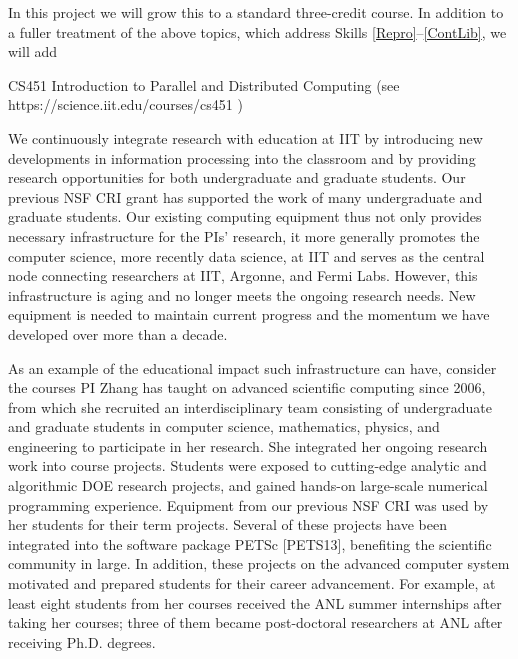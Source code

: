 \documentclass[11pt]{NSFamsart}
\begin{document}
In this project we will grow this to a standard three-credit course.  In addition to a fuller treatment of the above topics, which address Skills \ref{Repro}--\ref{ContLib}, we will add 

CS451 Introduction to Parallel and Distributed Computing (see https://science.iit.edu/courses/cs451 )

We continuously integrate research with education at IIT by introducing new developments in information processing into the classroom and by providing research opportunities for both undergraduate and graduate students. Our previous NSF CRI grant has supported the work of many undergraduate and graduate students. Our existing computing equipment thus not only provides necessary infrastructure for the PIs' research, it more generally promotes the computer science, more recently data science, at IIT and serves as the central node connecting researchers at IIT, Argonne, and Fermi Labs. However, this infrastructure is aging and no longer meets the ongoing research needs. New equipment is needed to maintain current progress and the momentum we have developed over more than a decade.  

As an example of the educational impact such infrastructure can have, consider the courses PI Zhang has taught on advanced scientific computing since 2006, from which she recruited an interdisciplinary team consisting of undergraduate and graduate students in computer science, mathematics, physics, and engineering to participate in her research. She integrated her ongoing research work into course projects. Students were exposed to cutting-edge analytic and algorithmic DOE research projects, and gained hands-on large-scale numerical programming experience. Equipment from our previous NSF CRI was used by her students for their term projects. Several of these projects have been integrated into the software package PETSc [PETS13], benefiting the scientific community in large. In addition, these projects on the advanced computer system motivated and prepared students for their career advancement. For example, at least eight students from her courses received the ANL summer internships after taking her courses; three of them became post-doctoral researchers at ANL after receiving Ph.D. degrees. 
\end{document}
